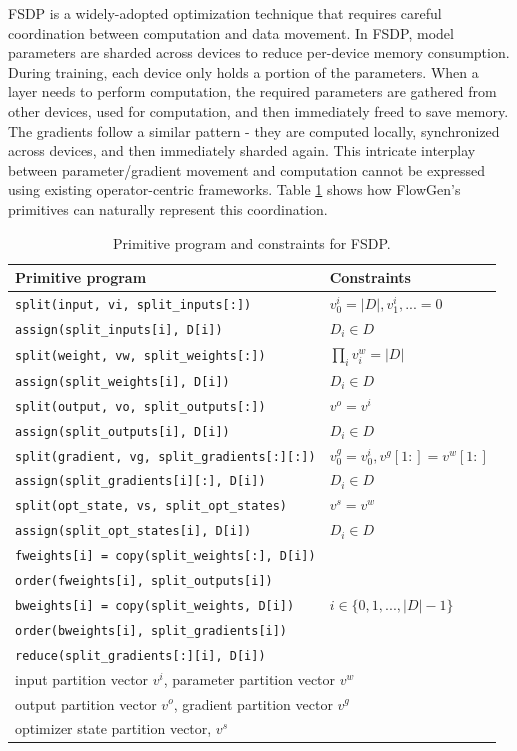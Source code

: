 FSDP is a widely-adopted optimization technique that requires careful coordination between computation and data movement. In FSDP, model parameters are sharded across devices to reduce per-device memory consumption. During training, each device only holds a portion of the parameters. When a layer needs to perform computation, the required parameters are gathered from other devices, used for computation, and then immediately freed to save memory. The gradients follow a similar pattern - they are computed locally, synchronized across devices, and then immediately sharded again. This intricate interplay between parameter/gradient movement and computation cannot be expressed using existing operator-centric frameworks\cite{lin2024nnscaler}. Table \ref{tab:fsdp} shows how FlowGen's primitives can naturally represent this coordination.

\begin{table}[h]
\centering
\footnotesize
\begin{tabular}{l|l}
\textbf{Primitive program} & \textbf{Constraints} \\
\hline
\texttt{split(input, vi, split\_inputs[:])} & $v^i_0 = |D|, v^i_1, ... = 0$ \\
\texttt{assign(split\_inputs[i], D[i])} & $D_i \in D$ \\
\texttt{split(weight, vw, split\_weights[:])} & $\prod_i v^w_i = |D|$ \\
\texttt{assign(split\_weights[i], D[i])} & $D_i \in D$ \\
\texttt{split(output, vo, split\_outputs[:])} & $v^o = v^i$ \\
\texttt{assign(split\_outputs[i], D[i])} & $D_i \in D$ \\
\texttt{split(gradient, vg, split\_gradients[:][:])} & $v^g_0 = v^i_0, v^g[1:] = v^w[1:]$\\
\texttt{assign(split\_gradients[i][:], D[i])} & $D_i \in D$ \\
\texttt{split(opt\_state, vs, split\_opt\_states)} & $v^s = v^w$ \\
\texttt{assign(split\_opt\_states[i], D[i])} & $D_i \in D$ \\
\hline
\texttt{fweights[i] = copy(split\_weights[:], D[i])} & \multirow{5}{*}{$i \in \{0, 1, ..., |D| - 1\}$} \\
\texttt{order(fweights[i], split\_outputs[i])} &  \\
\texttt{bweights[i] = copy(split\_weights, D[i])} &  \\
\texttt{order(bweights[i], split\_gradients[i])} & \\
\texttt{reduce(split\_gradients[:][i], D[i])} & \\
\hline
\multicolumn{2}{l}{input partition vector $v^i$, parameter partition vector $v^w$} \\
\multicolumn{2}{l}{output partition vector $v^o$, gradient partition vector $v^g$} \\
\multicolumn{2}{l}{optimizer state partition vector, $v^s$} \\
\hline
\end{tabular}
\caption{Primitive program and constraints for FSDP.}
\label{tab:fsdp}
\end{table}

